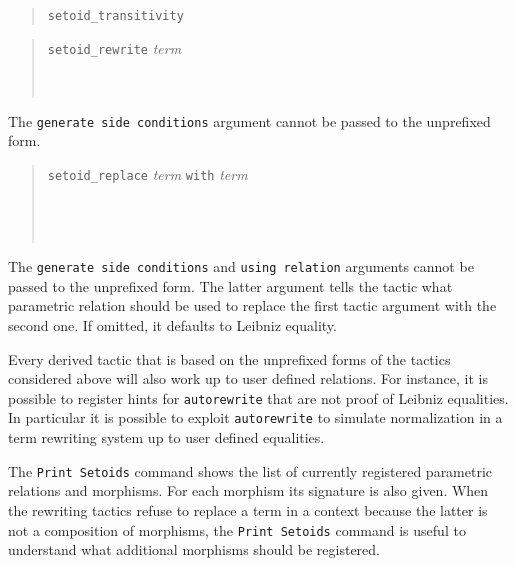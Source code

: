 \begin{verse}
  \texttt{setoid\_transitivity}
\end{verse}

\begin{verse}
  \texttt{setoid\_rewrite}  \textit{term}\\
  ~\\
  ~\\
\end{verse}

The \texttt{generate side conditions} argument cannot be passed to the
unprefixed form.

\begin{verse}
  \texttt{setoid\_replace} \textit{term} \texttt{with} \textit{term}
  ~\\
  ~\\
  ~\\
  ~
\end{verse}

The  \texttt{generate  side  conditions} and  \texttt{using  relation}
arguments cannot be passed to the unprefixed form. The latter argument
tells the  tactic what parametric  relation should be used  to replace
the first tactic argument with the second one. If omitted, it defaults
to Leibniz equality.

Every derived tactic that is based on the unprefixed forms of the tactics
considered above will also work up to user defined relations. For instance,
it is possible to register hints for \texttt{autorewrite} that are
not proof of Leibniz equalities. In particular it is possible to exploit
\texttt{autorewrite} to simulate normalization in a term rewriting system
up to user defined equalities.

The \texttt{Print Setoids} command shows the list of currently registered
parametric relations and morphisms. For each morphism its signature is also
given. When the rewriting tactics refuse to replace a term in a context
because the latter is not a composition of morphisms, the \texttt{Print Setoids}
command is useful to understand what additional morphisms should be registered.

